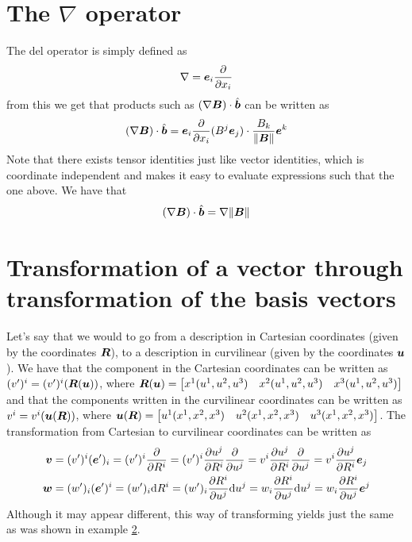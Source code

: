 \documentclass[a4paper, 12pt]{article}
\begin{document}
\section{The $\nabla$ operator}
The del operator is simply defined as
%
\begin{align*}
 \nabla = \boldsymbol{e}_i \frac{\partial {}}{\partial{x_i}}
\end{align*}
%
from this we get that products such as $(\nabla \boldsymbol{B}) \cdot \hat{\boldsymbol{b}}$ can be 
written as
%
\begin{align*}
 (\nabla \boldsymbol{B}) \cdot \hat{\boldsymbol{b}} = 
 \boldsymbol{e}_i \frac{\partial {}}{\partial{x_i}} (B^j \boldsymbol{e}_j) \cdot \frac{B_k}{\|\boldsymbol{B}\|}\boldsymbol{e}^k
\end{align*}
%
Note that there exists tensor identities just like vector identities, which is 
coordinate independent and makes it easy to evaluate expressions such that the 
one above. We have that
%
\begin{align*}
 (\nabla \boldsymbol{B}) \cdot \hat{\boldsymbol{b}} = \nabla \|\boldsymbol{B}\|
\end{align*}




\section{Transformation of a vector through transformation of the basis vectors}
Let's say that we would to go from a description in Cartesian coordinates 
(given by the coordinates $\boldsymbol{R}$), to a description in curvilinear (given by 
the coordinates $\boldsymbol{u}$). We have that the component in the Cartesian
coordinates can be written as $(v')^i = 
(v')^i(\boldsymbol{R}(\boldsymbol{u}))$, where 
$\boldsymbol{R}(\boldsymbol{u}) =
 \begin{bmatrix}
  x^1(u^1,u^2,u^3)& 
  x^2(u^1,u^2,u^3)&
  x^3(u^1,u^2,u^3)
 \end{bmatrix}
$
and that the components written in the curvilinear coordinates can be written 
as
$v^i = 
v^i(\boldsymbol{u}(\boldsymbol{R}))$, where 
$\boldsymbol{u}(\boldsymbol{R}) =
 \begin{bmatrix}
  u^1(x^1,x^2,x^3)& 
  u^2(x^1,x^2,x^3)&
  u^3(x^1,x^2,x^3)
 \end{bmatrix}
$. The transformation from Cartesian to curvilinear coordinates can be written 
as
%
\begin{align*}
 \boldsymbol{v} &=
 (v')^i(\boldsymbol{e}')_i =
 (v')^i\frac{\partial {}}{\partial{R^i}} = 
 (v')^i \frac{\partial {u^j}}{\partial{R^i}}\frac{\partial {}}{\partial{u^j}} =
 v^i \frac{\partial {u^j}}{\partial{R^i}}\frac{\partial {}}{\partial{u^j}} =
 v^i \frac{\partial {u^j}}{\partial{R^i}}\boldsymbol{e}_j
 \\
 \boldsymbol{w} &=
 (w')_i(\boldsymbol{e}')^i = 
 (w')_i\text{d}R^i = 
 (w')_i \frac{\partial {R^i}}{\partial{u^j}}\text{d}u^j =
 w_i \frac{\partial {R^i}}{\partial{u^j}}\text{d}u^j =
 w_i \frac{\partial {R^i}}{\partial{u^j}}\boldsymbol{e}^j
\end{align*}
%
Although it may appear different, this way of transforming yields just the same 
as was shown in example \hyperref[ex:vft]{2}.


\nocite{diverno_1992}
\nocite{arfken_2012}
\nocite{DHaeseleer_1991}
\nocite{wiki_co_cont}
\nocite{wiki_co_trans}
\nocite{diverno_url}
\nocite{physics_forum}
\nocite{wiki_cot_space}
\nocite{mathworld_pseudo}
\nocite{wiki_curvilinear}



\end{document}
